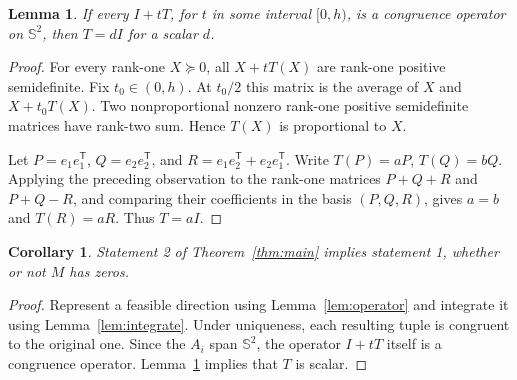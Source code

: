 \documentclass[11pt]{article}
\newtheorem{lemma}[theorem]{Lemma}
\newtheorem{corollary}[theorem]{Corollary}
\newcommand{\Sym}{\mathbb S^2}
\begin{document}
\begin{lemma}\label{lem:line}
If every $I+tT$, for $t$ in some interval $[0,h)$, is a congruence operator on $\Sym$, then $T=dI$ for a scalar $d$.
\end{lemma}
\begin{proof}
For every rank-one $X\succeq0$, all $X+tT(X)$ are rank-one positive semidefinite. Fix $t_0\in(0,h)$. At $t_0/2$ this matrix is the average of $X$ and $X+t_0T(X)$. Two nonproportional nonzero rank-one positive semidefinite matrices have rank-two sum. Hence $T(X)$ is proportional to $X$.

Let $P=e_1e_1^{\mathsf T}$, $Q=e_2e_2^{\mathsf T}$, and $R=e_1e_2^{\mathsf T}+e_2e_1^{\mathsf T}$. Write $T(P)=aP$, $T(Q)=bQ$. Applying the preceding observation to the rank-one matrices $P+Q+R$ and $P+Q-R$, and comparing their coefficients in the basis $(P,Q,R)$, gives $a=b$ and $T(R)=aR$. Thus $T=aI$.
\end{proof}

\begin{corollary}\label{cor:reverse}
Statement 2 of Theorem~\ref{thm:main} implies statement 1, whether or not $M$ has zeros.
\end{corollary}
\begin{proof}
Represent a feasible direction using Lemma~\ref{lem:operator} and integrate it using Lemma~\ref{lem:integrate}. Under uniqueness, each resulting tuple is congruent to the original one. Since the $A_i$ span $\Sym$, the operator $I+tT$ itself is a congruence operator. Lemma~\ref{lem:line} implies that $T$ is scalar.
\end{proof}
\end{document}
